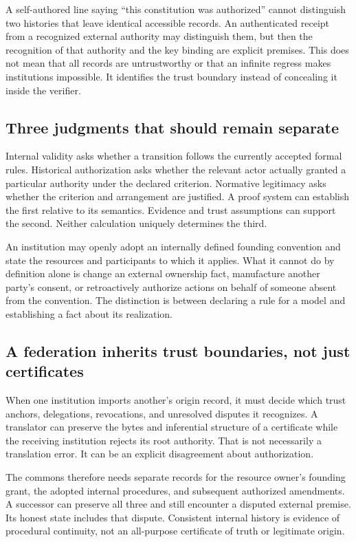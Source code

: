 A self-authored line saying ``this constitution was authorized'' cannot distinguish two histories that leave identical accessible records. An authenticated receipt from a recognized external authority may distinguish them, but then the recognition of that authority and the key binding are explicit premises. This does not mean that all records are untrustworthy or that an infinite regress makes institutions impossible. It identifies the trust boundary instead of concealing it inside the verifier.

\subsection{Three judgments that should remain separate}
Internal validity asks whether a transition follows the currently accepted formal rules. Historical authorization asks whether the relevant actor actually granted a particular authority under the declared criterion. Normative legitimacy asks whether the criterion and arrangement are justified. A proof system can establish the first relative to its semantics. Evidence and trust assumptions can support the second. Neither calculation uniquely determines the third.

An institution may openly adopt an internally defined founding convention and state the resources and participants to which it applies. What it cannot do by definition alone is change an external ownership fact, manufacture another party's consent, or retroactively authorize actions on behalf of someone absent from the convention. The distinction is between declaring a rule for a model and establishing a fact about its realization.

\subsection{A federation inherits trust boundaries, not just certificates}
When one institution imports another's origin record, it must decide which trust anchors, delegations, revocations, and unresolved disputes it recognizes. A translator can preserve the bytes and inferential structure of a certificate while the receiving institution rejects its root authority. That is not necessarily a translation error. It can be an explicit disagreement about authorization.

The commons therefore needs separate records for the resource owner's founding grant, the adopted internal procedures, and subsequent authorized amendments. A successor can preserve all three and still encounter a disputed external premise. Its honest state includes that dispute. Consistent internal history is evidence of procedural continuity, not an all-purpose certificate of truth or legitimate origin.

